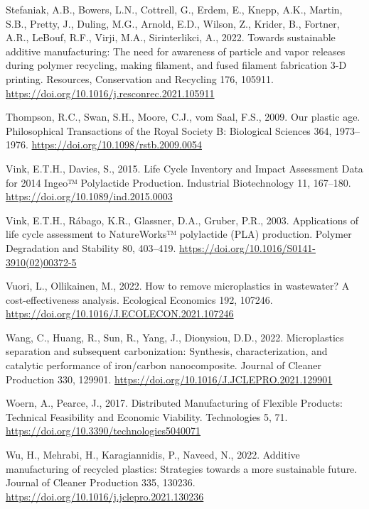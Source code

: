 \documentclass[12pt]{elsarticle} %
\newlength{\cslhangindent}
\newlength{\cslentryspacingunit} %
\newenvironment{CSLReferences}[2] %
 {%
  \setlength{\parindent}{0pt}
  \ifodd #1
  \let\oldpar\par
  \def\par{\hangindent=\cslhangindent\oldpar}
  \fi
  \setlength{\parskip}{#2\cslentryspacingunit}
 }%
 {}
\begin{document}
\begin{CSLReferences}{1}{0}
\leavevmode{}%
Stefaniak, A.B., Bowers, L.N., Cottrell, G., Erdem, E., Knepp, A.K., Martin, S.B., Pretty, J., Duling, M.G., Arnold, E.D., Wilson, Z., Krider, B., Fortner, A.R., LeBouf, R.F., Virji, M.A., Sirinterlikci, A., 2022. Towards sustainable additive manufacturing: {The} need for awareness of particle and vapor releases during polymer recycling, making filament, and fused filament fabrication 3-{D} printing. Resources, Conservation and Recycling 176, 105911. \url{https://doi.org/10.1016/j.resconrec.2021.105911}

\leavevmode{}%
Thompson, R.C., Swan, S.H., Moore, C.J., vom Saal, F.S., 2009. Our plastic age. Philosophical Transactions of the Royal Society B: Biological Sciences 364, 1973--1976. \url{https://doi.org/10.1098/rstb.2009.0054}

\leavevmode{}%
Vink, E.T.H., Davies, S., 2015. Life {Cycle Inventory} and {Impact Assessment Data} for 2014 {Ingeo}™ {Polylactide Production}. Industrial Biotechnology 11, 167--180. \url{https://doi.org/10.1089/ind.2015.0003}

\leavevmode{}%
Vink, E.T.H., Rábago, K.R., Glassner, D.A., Gruber, P.R., 2003. Applications of life cycle assessment to {NatureWorks}™ polylactide ({PLA}) production. Polymer Degradation and Stability 80, 403--419. \url{https://doi.org/10.1016/S0141-3910(02)00372-5}

\leavevmode{}%
Vuori, L., Ollikainen, M., 2022. How to remove microplastics in wastewater? {A} cost-effectiveness analysis. Ecological Economics 192, 107246. \url{https://doi.org/10.1016/J.ECOLECON.2021.107246}

\leavevmode{}%
Wang, C., Huang, R., Sun, R., Yang, J., Dionysiou, D.D., 2022. Microplastics separation and subsequent carbonization: {Synthesis}, characterization, and catalytic performance of iron/carbon nanocomposite. Journal of Cleaner Production 330, 129901. \url{https://doi.org/10.1016/J.JCLEPRO.2021.129901}

\leavevmode{}%
Woern, A., Pearce, J., 2017. Distributed {Manufacturing} of {Flexible Products}: {Technical Feasibility} and {Economic Viability}. Technologies 5, 71. \url{https://doi.org/10.3390/technologies5040071}

\leavevmode{}%
Wu, H., Mehrabi, H., Karagiannidis, P., Naveed, N., 2022. Additive manufacturing of recycled plastics: {Strategies} towards a more sustainable future. Journal of Cleaner Production 335, 130236. \url{https://doi.org/10.1016/j.jclepro.2021.130236}


\end{CSLReferences}
\end{document}
